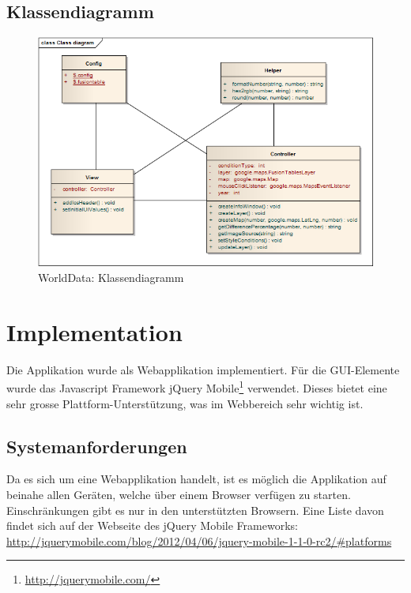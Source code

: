 \subsection{Klassendiagramm}
\begin{figure}[H]
	\centering
	\includegraphics[scale=0.7]{images/usecase1-worlddata/uml/worlddata-classdiagram.png}
	\caption{WorldData: Klassendiagramm}
	\label{worlddata-classdiagram}
\end{figure}

\section{Implementation}
Die Applikation wurde als Webapplikation implementiert. Für die GUI-Elemente wurde das Javascript Framework jQuery Mobile\footnote{\url{http://jquerymobile.com/}} verwendet. Dieses bietet eine sehr grosse Plattform-Unterstützung, was im Webbereich sehr wichtig ist.

\subsection{Systemanforderungen}
Da es sich um eine Webapplikation handelt, ist es möglich die Applikation auf beinahe allen Geräten, welche über einem Browser verfügen zu starten. Einschränkungen gibt es nur in den unterstützten Browsern. Eine Liste davon findet sich auf der Webseite des jQuery Mobile Frameworks:  \url{http://jquerymobile.com/blog/2012/04/06/jquery-mobile-1-1-0-rc2/#platforms}

